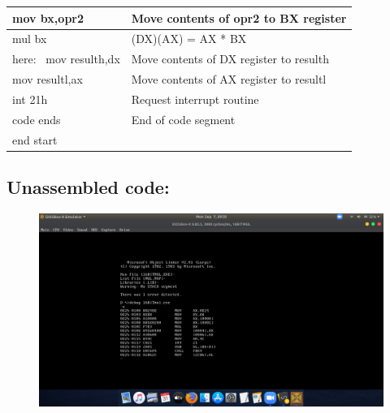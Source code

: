 \documentclass[12pt,a4paper]{article}
\begin{document}
\begin{flushleft}
\begin{table}[htb]
{\begin{tabular}{|l|l|}
\hline
mov bx,opr2                                                      & Move contents of opr2 to BX register          \\ 
\hline
mul bx                                                           & (DX)(AX) = AX * BX                            \\ 
\hline
here:~ mov resulth,dx                                            & Move contents of DX register to resulth       \\ 
\hline
mov resultl,ax                                                   & Move contents of AX register to resultl       \\ 
\hline
int 21h                                                          & Request interrupt routine                     \\ 
\hline
code ends                                                        & End of code segment                           \\
\hline
end start                                                        &                                               \\
\hline
\end{tabular}
}
\end{table}

\newpage
\subsection*{\textbf{Unassembled code:}}
\begin{figure}[h]
    \centering
    \includegraphics[trim = 100mm 60mm 150mm 127mm, clip, width = \textwidth]{MultiplicationUS.png}
\end{figure}

\end{flushleft}
\end{document}
